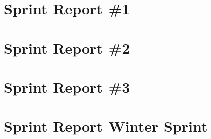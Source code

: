 

\section{Sprint Report \#1}



\section{Sprint Report \#2}



\section{Sprint Report \#3}



\section{Sprint Report Winter Sprint}


